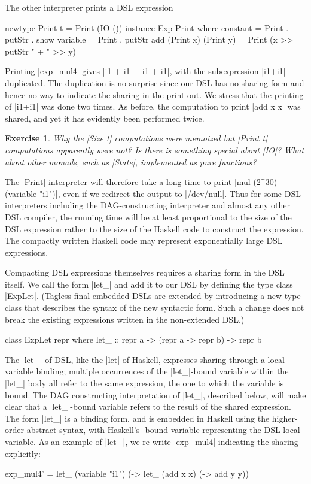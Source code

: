 \documentclass[submission,copyright,creativecommons]{eptcs}
\newtheorem{Exercise}{Exercise} \newcommand\aside[1]{}
\begin{document}
The other interpreter prints a DSL expression
\begin{code}
newtype Print t = Print (IO ())
instance Exp Print where
    constant = Print . putStr . show 
    variable = Print . putStr
    add (Print x) (Print y) = Print (x >> putStr " + " >> y)
\end{code}
Printing |exp_mul4| gives |i1 + i1 + i1 + i1|, with the subexpression
|i1+i1| duplicated. The duplication is no surprise since our DSL has no
sharing form and hence no way to indicate the sharing in the
print-out. We stress that the printing of |i1+i1| was done
two times. As before, the computation to print |add x x| was shared, and
yet it has evidently been performed twice.
\begin{Exercise}
Why the |Size t| computations were memoized but |Print t| computations
apparently were not? Is there is something special about |IO|?
What about other monads, such as |State|, implemented
as pure functions?
\end{Exercise}
The |Print| interpreter will therefore take a long time to print
|mul (2^30) (variable "i1")|, even if we redirect
the output to |/dev/null|. Thus for some DSL interpreters
including the DAG-constructing interpreter and almost any other
DSL compiler, the running time will be at least proportional
to the size of the DSL expression rather to the size of
the Haskell code to construct the expression. The compactly written
Haskell code may represent exponentially large DSL expressions.

Compacting DSL expressions themselves requires a sharing form in
the DSL itself. We call the form |let_| and add it to our
DSL by defining the type class |ExpLet|.  (Tagless-final embedded
DSLs are extended by introducing a new type class that describes the
syntax of the new syntactic form.  Such a change does not break the
existing expressions written in the non-extended DSL.)
\begin{code}
class ExpLet repr where
  let_ :: repr a -> (repr a -> repr b) -> repr b
\end{code}
The |let_| of DSL, like the |let| of Haskell, expresses sharing
through a local variable binding; multiple occurrences of the
|let_|-bound variable within the |let_| body all refer to the same
expression, the one to which the variable is bound. The DAG
constructing interpretation of |let_|, described below, will make
clear that a |let_|-bound variable refers to the result of the shared
expression. The form |let_| is a binding form, and is embedded in
Haskell using the higher-order abstract syntax, with Haskell's
-bound variable representing the DSL local variable. As an
example of |let_|, we re-write |exp_mul4| indicating the sharing
explicitly:
\begin{code}
exp_mul4' = 
 let_ (variable "i1") (\x ->
 let_ (add x x)       (\y->
 add y y))
\end{code}
\end{document}
